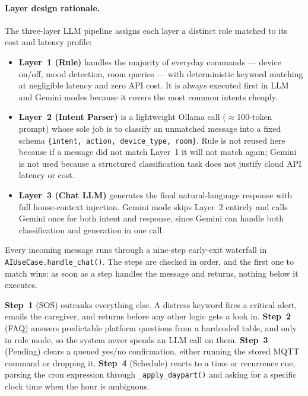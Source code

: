 \paragraph{Layer design rationale.}
The three-layer LLM pipeline assigns each layer a distinct role matched to its cost and latency profile:

\begin{itemize}
    \item \textbf{Layer~1 (Rule)} handles the majority of everyday commands --- device on/off, mood detection, room queries --- with deterministic keyword matching at negligible latency and zero API cost. It is always executed first in LLM and Gemini modes because it covers the most common intents cheaply.

    \item \textbf{Layer~2 (Intent Parser)} is a lightweight Ollama call ($\approx$100-token prompt) whose sole job is to classify an unmatched message into a fixed schema \texttt{\{intent, action, device\_type, room\}}. Rule is not reused here because if a message did not match Layer~1 it will not match again; Gemini is not used because a structured classification task does not justify cloud API latency or cost.

    \item \textbf{Layer~3 (Chat LLM)} generates the final natural-language response with full house-context injection. Gemini mode skips Layer~2 entirely and calls Gemini once for both intent and response, since Gemini can handle both classification and generation in one call.
\end{itemize}


Every incoming message runs through a nine-step early-exit waterfall in \texttt{AIUseCase.handle\_chat()}. The steps are checked in order, and the first one to match wins: as soon as a step handles the message and returns, nothing below it executes.

\textbf{Step~1} (SOS) outranks everything else. A distress keyword fires a critical alert, emails the caregiver, and returns before any other logic gets a look in. \textbf{Step~2} (FAQ) answers predictable platform questions from a hardcoded table, and only in rule mode, so the system never spends an LLM call on them. \textbf{Step~3} (Pending) clears a queued yes/no confirmation, either running the stored MQTT command or dropping it. \textbf{Step~4} (Schedule) reacts to a time or recurrence cue, parsing the cron expression through \texttt{\_apply\_daypart()} and asking for a specific clock time when the hour is ambiguous.

